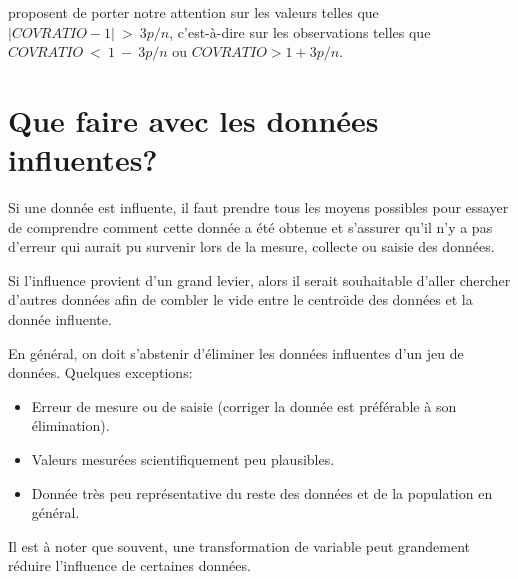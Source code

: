 \citet{Bel_Kuh_Wel:80} proposent de porter notre attention sur les valeurs telles que
$|COVRATIO-1|~>~3p/n$, c'est-à-dire sur les observations telles que\\ $COVRATIO~<~1~-~3p/n$ ou $COVRATIO>1+3p/n$.



\section{Que faire avec les données influentes?}
Si une donnée est influente, il faut prendre tous les moyens
possibles pour essayer de comprendre comment cette donnée a été
obtenue et s'assurer qu'il n'y a pas d'erreur qui aurait pu
survenir lors de la mesure, collecte ou saisie des données.

Si l'influence provient d'un grand
levier, alors il serait souhaitable d'aller chercher d'autres
données afin de combler le vide entre le centro\"{\i}de des
données et la donnée influente.

En général, on doit s'abstenir d'éliminer les données
influentes d'un jeu de données. Quelques exceptions:
\begin{itemize}
\item Erreur de mesure ou  de  saisie (corriger la donnée
est préférable \`a son élimination). \item Valeurs
mesurées scientifiquement peu plausibles. \item Donnée très
peu représentative du reste des données et de la population en
général. \end{itemize}

Il est \`a noter que souvent, une transformation de variable peut
grandement réduire l'influence de certaines données. 